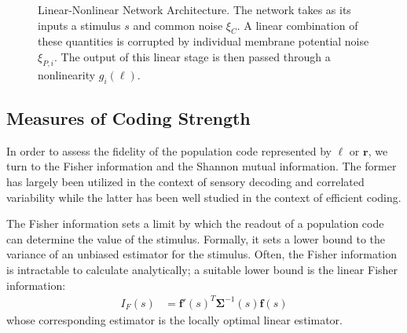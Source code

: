 \documentclass[12pt]{article}
\begin{document}
\begin{figure}[ht]
{}
	
	\caption{Linear-Nonlinear Network Architecture. The network takes as its inputs a stimulus $s$ and common noise $\xi_C$. A linear combination of these quantities is corrupted by individual membrane potential noise $\xi_{P,i}$. The output of this linear stage is then passed through a nonlinearity $g_i(\ell)$.}
	\label{architecture}
\end{figure}

\subsection{Measures of Coding Strength}
In order to assess the fidelity of the population code represented by $\boldsymbol{\ell}$ or $\mathbf{r}$, we turn to the Fisher information and the Shannon mutual information. The former has largely been utilized in the context of sensory decoding and correlated variability \citep{abbott1999} while the latter has been well studied in the context of efficient coding. 

The Fisher information sets a limit by which the readout of a population code can determine the value of the stimulus. Formally, it sets a lower bound to the variance of an unbiased estimator for the stimulus. Often, the Fisher information is intractable to calculate analytically; a suitable lower bound is the linear Fisher information:
\begin{align}
I_F(s) &= \mathbf{f}'(s)^T \boldsymbol{\Sigma}^{-1}(s) \mathbf{f}(s)
\end{align}
whose corresponding estimator is the locally optimal linear estimator. 
\end{document}
